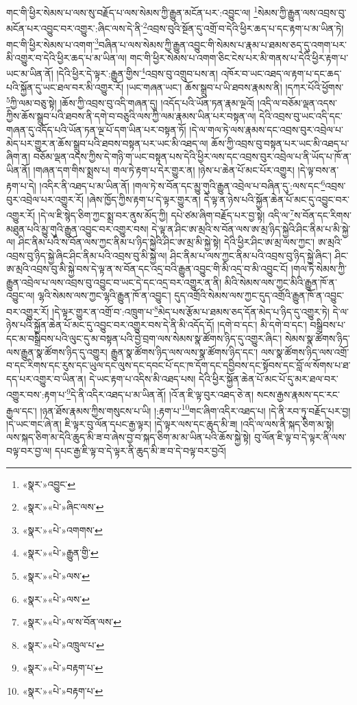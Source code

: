 གང་གི་ཕྱིར་སེམས་པ་ལས་སུ་བརྗོད་པ་ལས་སེམས་ཀྱི་རྒྱུན་མངོན་པར་:འབྱུང་ལ། \footnote{«སྣར་»འབྱུང་}སེམས་ཀྱི་རྒྱུན་ལས་འབྲས་བུ་མངོན་པར་འབྱུང་བར་འགྱུར་:ཞིང་ལས་དེ་ནི་\footnote{«སྣར་»«པེ་»ཞིང་ལས་}འབྲས་བུའི་སྔོན་དུ་འགྲོ་བ་དེའི་ཕྱིར་ཆད་པ་དང་རྟག་པ་མ་ཡིན་ཏེ། གང་གི་ཕྱིར་སེམས་པ་འགག་\footnote{«སྣར་»«པེ་»འགགས་}བཞིན་པ་ལས་སེམས་ཀྱི་རྒྱུན་འབྱུང་གི་སེམས་པ་རྣམ་པ་ཐམས་ཅད་དུ་འགག་པར་མི་འགྱུར་བ་དེའི་ཕྱིར་ཆད་པ་མ་ཡིན་ལ། གང་གི་ཕྱིར་སེམས་པ་འགག་ཅིང་ངེས་པར་མི་གནས་པ་དེའི་ཕྱིར་རྟག་པ་ཡང་མ་ཡིན་ནོ། །དེའི་ཕྱིར་དེ་ལྟར་:རྒྱུན་གྱིས་\footnote{«སྣར་»«པེ་»རྒྱུན་གྱི་}འབྲས་བུ་འགྲུབ་པས་ན། འཁོར་བ་ཡང་འཐད་ལ་རྟག་པ་དང་ཆད་པའི་སྐྱོན་དུ་ཡང་ཐལ་བར་མི་འགྱུར་རོ། །ཡང་གཞན་ཡང་། ཆོས་སྒྲུབ་པ་ཡི་ཐབས་རྣམས་ནི། །དཀར་པོའི་ཕྱོགས་\footnote{«སྣར་»«པེ་»ལས་}ཀྱི་ལམ་བཅུ་སྟེ། །ཆོས་ཀྱི་འབྲས་བུ་འདི་གཞན་དུ། །འདོད་པའི་ཡོན་ཏན་རྣམ་ལྔའོ། །འདི་ལ་བཅོམ་ལྡན་འདས་ཀྱིས་ཆོས་སྒྲུབ་པའི་ཐབས་ནི་དགེ་བ་བཅུའི་ལས་ཀྱི་ལམ་རྣམས་ཡིན་པར་བསྟན་ལ། དེའི་འབྲས་བུ་ཡང་འདི་དང་གཞན་དུ་འདོད་པའི་ཡོན་ཏན་ལྔ་པོ་དག་ཡིན་པར་བསྟན་ཏོ། །དེ་ལ་གལ་ཏེ་ལས་རྣམས་དང་འབྲས་བུར་འབྲེལ་པ་མེད་པར་གྱུར་ན་ཆོས་སྒྲུབ་པའི་ཐབས་བསྟན་པར་ཡང་མི་འཐད་ལ། ཆོས་ཀྱི་འབྲས་བུ་བསྟན་པར་ཡང་མི་འཐད་པ་ཞིག་ན། བཅོམ་ལྡན་འདས་ཀྱིས་དེ་གཉི་ག་ཡང་བསྟན་པས་དེའི་ཕྱིར་ལས་དང་འབྲས་བུར་འབྲེལ་པ་ནི་ཡོད་པ་ཁོ་ན་ཡིན་ནོ། །གཞན་དག་གིས་སྨྲས་པ། གལ་ཏེ་རྟག་པ་དེར་གྱུར་ན། །ཉེས་པ་ཆེན་པོ་མང་པོར་འགྱུར། །དེ་ལྟ་བས་ན་རྟག་པ་དེ། །འདིར་ནི་འཐད་པ་མ་ཡིན་ནོ། །གལ་ཏེ་ས་བོན་དང་མྱུ་གུའི་རྒྱུན་འབྲེལ་པ་བཞིན་དུ་:ལས་དང་\footnote{«སྣར་»«པེ་»ལས་}འབྲས་བུར་འབྲེལ་པར་འགྱུར་རོ། །ཞེས་ཁྱོད་ཀྱིས་རྟག་པ་དེ་ལྟར་གྱུར་ན། དེ་ལྟ་ན་ཉེས་པའི་སྐྱོན་ཆེན་པོ་མང་དུ་འབྱུང་བར་འགྱུར་རོ། །དེ་ལ་ཇི་སྙེད་ཅིག་ཀྱང་སྨྲ་བར་ནུས་མོད་ཀྱི། དཔེ་ཙམ་ཞིག་བརྗོད་པར་བྱ་སྟེ། འདི་ལ་\footnote{«སྣར་»«པེ་»ལ་ས་བོན་ལས་}ས་བོན་དང་རིགས་མཐུན་པའི་མྱུ་གུའི་རྒྱུན་འབྱུང་བར་འགྱུར་བས། དེ་ལྟ་ན་ཤིང་ཨ་མྲའི་ས་བོན་ལས་ཨ་མྲ་ཉིད་སྐྱེའི་ཤིང་ནིམ་པ་མི་སྐྱེ་ལ། ཤིང་ནིམ་པའི་ས་བོན་ལས་ཀྱང་ནིམ་པ་ཉིད་སྐྱེའི་ཤིང་ཨ་མྲ་མི་སྐྱེ་སྟེ། དེའི་ཕྱིར་ཤིང་ཨ་མྲ་ལས་ཀྱང་། ཨ་མྲའི་འབྲས་བུ་ཉིད་སྐྱེ་ཞིང་ཤིང་ནིམ་པའི་འབྲས་བུ་མི་སྐྱེ་ལ། ཤིང་ནིམ་པ་ལས་ཀྱང་ནིམ་པའི་འབྲས་བུ་ཉིད་སྐྱེ་ཞིང་། ཤིང་ཨ་མྲའི་འབྲས་བུ་མི་སྐྱེ་བས་དེ་ལྟ་ན་ས་བོན་དང་འདྲ་བའི་རྒྱུན་འབྱུང་གི་མི་འདྲ་བ་མི་འབྱུང་ངོ། །གལ་ཏེ་སེམས་ཀྱི་རྒྱུན་འབྲེལ་པ་ལས་འབྲས་བུ་འབྱུང་བ་ཡང་དེ་དང་འདྲ་བར་འགྱུར་ན་ནི། མིའི་སེམས་ལས་ཀྱང་མིའི་རྒྱུན་ཁོ་ན་འབྱུང་ལ། ལྷའི་སེམས་ལས་ཀྱང་ལྷའི་རྒྱུན་ཁོ་ན་འབྱུང་། དུད་འགྲོའི་སེམས་ལས་ཀྱང་དུད་འགྲོའི་རྒྱུན་ཁོ་ན་འབྱུང་བར་འགྱུར་རོ། །དེ་ལྟར་གྱུར་ན་འགྲོ་བ་:འཁྲུག་པ་\footnote{«སྣར་»«པེ་»འཁྲུལ་པ་}མེད་པས་རྩོམ་པ་ཐམས་ཅད་དོན་མེད་པ་ཉིད་དུ་འགྱུར་ཏེ། དེ་ལ་ཉེས་པའི་སྐྱོན་ཆེན་པོ་མང་དུ་འབྱུང་བར་འགྱུར་བས་དེ་ནི་མི་འདོད་དོ། །དགེ་བ་དང་། མི་དགེ་བ་དང་། བསྒྲིབས་པ་དང་མ་བསྒྲིབས་པའི་ལུང་དུ་མ་བསྟན་པའི་བྱེ་བྲག་ལས་སེམས་སྣ་ཚོགས་ཉིད་དུ་འགྱུར་ཞིང་། སེམས་སྣ་ཚོགས་ཉིད་ལས་རྒྱུན་སྣ་ཚོགས་ཉིད་དུ་འགྱུར། རྒྱུན་སྣ་ཚོགས་ཉིད་ལས་ལས་སྣ་ཚོགས་ཉིད་དང་། ལས་སྣ་ཚོགས་ཉིད་ལས་འགྲོ་བ་དང་རིགས་དང་རུས་དང་ཡུལ་དང་ལུས་དང་དབང་པོ་དང་ཁ་དོག་དང་དབྱིབས་དང་སྟོབས་དང་བློ་ལ་སོགས་པ་ཐ་དད་པར་འགྱུར་བ་ཡིན་ན། དེ་ཡང་རྟག་པ་འདིས་མི་འཐད་པས། དེའི་ཕྱིར་སྐྱོན་ཆེན་པོ་མང་པོ་དུ་མར་ཐལ་བར་འགྱུར་བས་:རྟག་པ་\footnote{«སྣར་»«པེ་»བརྟག་པ་}དེ་ནི་འདིར་འཐད་པ་མ་ཡིན་ནོ། །འོ་ན་ཇི་ལྟ་བུར་འཐད་ཅེ་ན། སངས་རྒྱས་རྣམས་དང་རང་རྒྱལ་དང་། །ཉན་ཐོས་རྣམས་ཀྱིས་གསུངས་པ་ཡི། །:རྟག་པ་\footnote{«སྣར་»«པེ་»བརྟག་པ་}གང་ཞིག་འདིར་འཐད་པ། །དེ་ནི་རབ་ཏུ་བརྗོད་པར་བྱ། །དེ་ཡང་གང་ཞེ་ན། ཇི་ལྟར་བུ་ལོན་དཔང་རྒྱ་ལྟར། །དེ་ལྟར་ལས་དང་ཆུད་མི་ཟ། །འདི་ལ་ལས་ནི་སྐད་ཅིག་མ་སྟེ། ལས་སྐད་ཅིག་མ་དེའི་ཆུད་མི་ཟ་བ་ཞེས་བྱ་བ་སྐད་ཅིག་མ་མ་ཡིན་པའི་ཆོས་སྐྱེ་སྟེ། བུ་ལོན་ཇི་ལྟ་བ་དེ་ལྟར་ནི་ལས་བལྟ་བར་བྱ་ལ། དཔང་རྒྱ་ཇི་ལྟ་བ་དེ་ལྟར་ནི་ཆུད་མི་ཟ་བ་དེ་བལྟ་བར་བྱའོ། 